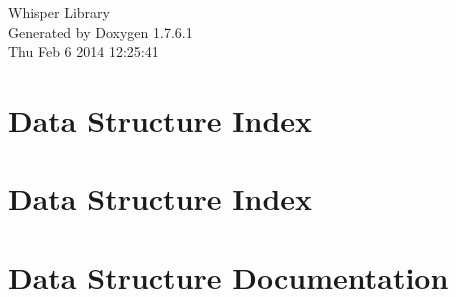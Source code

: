 \documentclass[a4paper]{book}
\begin{document}
\hypersetup{pageanchor=false,citecolor=blue}
\begin{titlepage}
\vspace*{7cm}
\begin{center}
{\Large \-Whisper \-Library }\\
\vspace*{1cm}
{\large \-Generated by Doxygen 1.7.6.1}\\
\vspace*{0.5cm}
{\small Thu Feb 6 2014 12:25:41}\\
\end{center}
\end{titlepage}
\clearemptydoublepage
{}
\tableofcontents
\clearemptydoublepage
{}
\hypersetup{pageanchor=true,citecolor=blue}
\chapter{\-Data \-Structure \-Index}

\chapter{\-Data \-Structure \-Index}

\chapter{\-Data \-Structure \-Documentation}











\printindex
\end{document}
